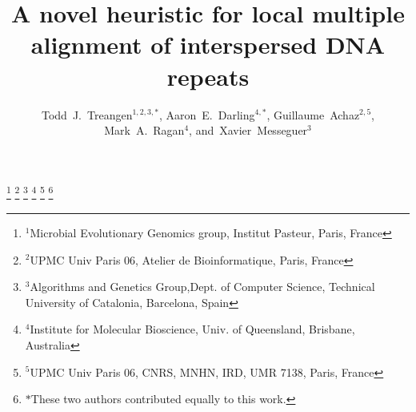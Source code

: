 \documentclass[9.5pt,journal,final,finalsubmission,twocolumn]{IEEEtran}
\begin{document}
%
\title{A novel heuristic for local multiple alignment of interspersed DNA repeats}
%
%

\author{Todd~J.~Treangen$^{1,2,3,\ast}$,
        Aaron~E.~Darling$^{4,\ast}$,
        Guillaume~Achaz$^{2,5}$,
        Mark~A.~Ragan$^{4}$,
        and~Xavier~Messeguer$^{3}$%
        }

\thanks{$^1$Microbial Evolutionary Genomics group, Institut Pasteur, Paris, France}
\thanks{$^2$UPMC Univ Paris 06, Atelier de Bioinformatique, Paris, France}
\thanks{$^3$Algorithms and Genetics Group,Dept. of Computer Science, Technical University of Catalonia, Barcelona, Spain}
\thanks{$^4$Institute for Molecular Bioscience, Univ. of Queensland, Brisbane, Australia}
\thanks{$^5$UPMC Univ Paris 06, CNRS, MNHN, IRD, UMR 7138, Paris, France}
\thanks{$\ast$These two authors contributed equally to this work.}%


%
%


\end{document}
